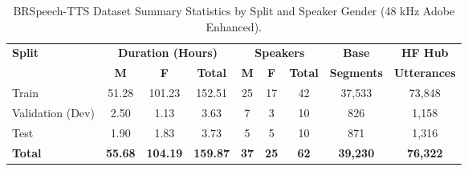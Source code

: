 \begin{table}[ht!]
\centering
\caption{BRSpeech-TTS Dataset Summary Statistics by Split and Speaker Gender (48 kHz Adobe Enhanced).}
\label{tab:brspeech_stats}
\begin{tabular}{|l|c|c|c|c|c|c|c|c|}
\hline
\textbf{Split} & \multicolumn{3}{c|}{\textbf{Duration (Hours)}} & \multicolumn{3}{c|}{\textbf{Speakers}} & \textbf{Base} & \textbf{HF Hub} \\
\cline{2-7}
 & \textbf{M} & \textbf{F} & \textbf{Total} & \textbf{M} & \textbf{F} & \textbf{Total} & \textbf{Segments} & \textbf{Utterances} \\
\hline
Train            & 51.28 & 101.23 & 152.51 & 25 & 17 & 42 & 37,533 & 73,848 \\
Validation (Dev) &  2.50 &   1.13 &   3.63 &  7 &  3 & 10 &    826 &  1,158 \\
Test             &  1.90 &   1.83 &   3.73 &  5 &  5 & 10 &    871 &  1,316 \\
\hline
\textbf{Total}   & \textbf{55.68} & \textbf{104.19} & \textbf{159.87} & \textbf{37} & \textbf{25} & \textbf{62} & \textbf{39,230} & \textbf{76,322} \\
\hline
\end{tabular}
\end{table}
